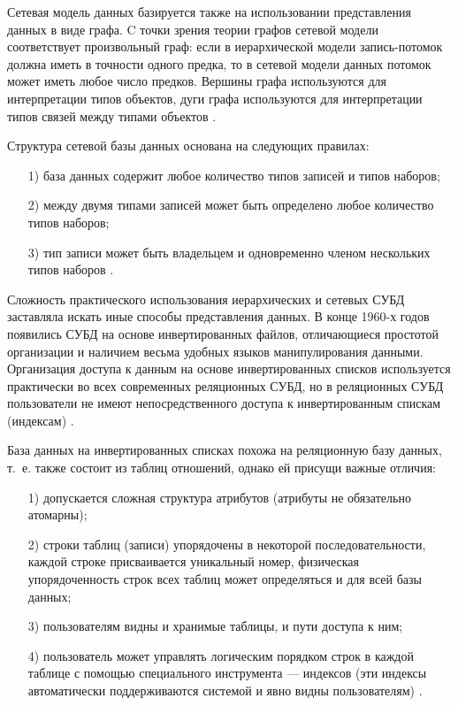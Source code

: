 \documentclass{bmstu}
\begin{document}
Сетевая модель данных базируется также на использовании представления данных в виде графа. 
C точки зрения теории графов сетевой модели соответствует произвольный граф: если в иерархической модели запись-потомок должна иметь в точности одного предка, то в сетевой модели данных потомок может иметь любое число предков. 
Вершины графа используются для интерпретации типов объектов, дуги графа используются для интерпретации типов связей между типами объектов \cite{Avrunev2018}.

Структура сетевой базы данных основана на следующих правилах:

\begin{enumerate}
\item[1)] база данных содержит любое количество типов записей и типов наборов;
\item[2)] между двумя типами записей может быть определено любое количество типов наборов;
\item[3)] тип записи может быть владельцем и одновременно членом нескольких типов наборов \cite{Avrunev2018}.
\end{enumerate}

Сложность практического использования иерархических и сетевых
СУБД заставляла искать иные способы представления данных. 
В конце 1960-х годов появились СУБД на основе инвертированных файлов, отличающиеся простотой организации и наличием весьма удобных языков манипулирования данными. Организация доступа к данным на основе инвертированных списков используется практически во всех современных реляционных СУБД, но в реляционных СУБД пользователи не имеют непосредственного доступа к инвертированным спискам (индексам) \cite{Avrunev2018}.

База данных на инвертированных списках похожа на реляционную
базу данных, т.~е. также состоит из таблиц отношений, однако ей присущи важные отличия:

\begin{enumerate}
\item[1)] допускается сложная структура атрибутов (атрибуты не обязательно атомарны);
\item[2)] строки таблиц (записи) упорядочены в некоторой последовательности, каждой строке присваивается уникальный номер, физическая упорядоченность строк всех таблиц может определяться и для всей базы данных;
\item[3)] пользователям видны и хранимые таблицы, и пути доступа к ним;
\item[4)] пользователь может управлять логическим порядком строк в каждой таблице с помощью специального инструмента --- индексов (эти индексы автоматически поддерживаются системой и явно видны пользователям) \cite{Avrunev2018}.
\end{enumerate}
\end{document}
